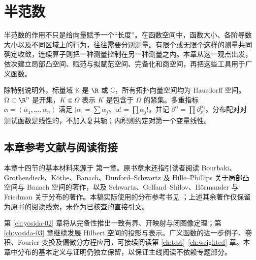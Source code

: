 \chapter{半范数}\label{ch:yosida-01}

半范数的作用不只是给向量赋予一个“长度”。在函数空间中，函数大小、各阶导数大小以及不同区域上的行为，往往需要分别测量。有限个或无限个这样的测量共同确定收敛，连续算子则把一种测量控制在另一种测量之内。本章从这一观点出发，依次建立局部凸空间、赋范与拟赋范空间、完备化和商空间，再把这些工具用于广义函数。

除特别说明外，标量域 $\mathbb K$ 是 $\R$ 或 $\mathbb{C}$，所有拓扑向量空间均为 Hausdorff 空间。$\Omega\subset\R^n$ 是开集，$K\Subset\Omega$ 表示 $K$ 是包含于 $\Omega$ 的紧集。多重指标 $\alpha=(\alpha_1,\ldots,\alpha_n)$ 满足 $|\alpha|=\sum\alpha_j$、$\alpha!=\prod\alpha_j!$，并记 $\partial^\alpha=\prod\partial_{x_j}^{\alpha_j}$。分布配对对测试函数是线性的，不加入复共轭；内积则约定对第一个变量线性。
















\section*{本章参考文献与阅读衔接}
{}
本章十四节的基本材料来源于 \cite{yosida-zh,yosida-en} 第一章。原书章末还指引读者阅读 Bourbaki、Grothendieck、Köthe、Banach、Dunford--Schwartz 及 Hille--Phillips 关于局部凸空间与 Banach 空间的著作，以及 Schwartz、Gelfand--Shilov、Hörmander 与 Friedman 关于分布的著作。本稿实际使用的分布参考书见 \cite{schwartz,gelfand}；上述其余著作仅保留为原书的阅读线索，未作为已核查的直接引文。

第 \ref{ch:yosida-02} 章将从完备性推出一致有界、开映射与闭图像定理；第 \ref{ch:yosida-03} 章继续发展 Hilbert 空间的投影与表示。广义函数的进一步例子、卷积、Fourier 变换及偏微分方程应用，可接续阅读第 \ref{ch:test}--\ref{ch:weighted} 章。本章中分布的基本定义与证明仍独立保留，以保证主线阅读不依赖专题部分。
